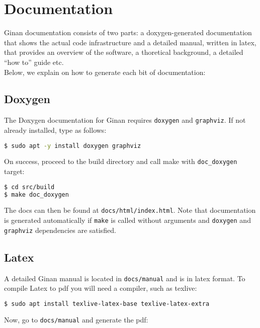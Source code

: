 \section{Documentation}\label{documentation}

Ginan documentation consists of two parts: a doxygen-generated
documentation that shows the actual code infrastructure and a detailed
manual, written in latex, that provides an overview of the software, a
thoretical background, a detailed ``how to'' guide etc.\\
Below, we explain on how to generate each bit of documentation:

\subsection{Doxygen}\label{doxygen}

The Doxygen documentation for Ginan requires \texttt{doxygen} and
\texttt{graphviz}. If not already installed, type as follows:

\begin{lstlisting}[language=bash]
$ sudo apt -y install doxygen graphviz
\end{lstlisting}

On success, proceed to the build directory and call make with
\texttt{doc\_doxygen} target:

\begin{lstlisting}[language=bash]
$ cd src/build
$ make doc_doxygen
\end{lstlisting}

The docs can then be found at \texttt{docs/html/index.html}. Note that
documentation is generated automatically if \texttt{make} is called
without arguments and \texttt{doxygen} and \texttt{graphviz}
dependencies are satisfied.

\subsection{Latex}\label{latex}

A detailed Ginan manual is located in \texttt{docs/manual} and is in
latex format. To compile Latex to pdf you will need a compiler, such as
texlive:

\begin{lstlisting}[language=bash]
$ sudo apt install texlive-latex-base texlive-latex-extra
\end{lstlisting}

Now, go to \texttt{docs/manual} and generate the pdf:

